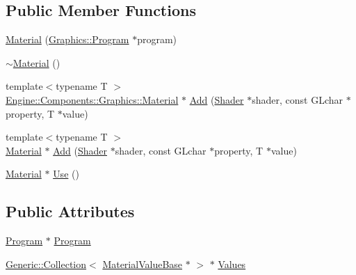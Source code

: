 \subsection*{Public Member Functions}
\begin{DoxyCompactItemize}
\item 
\mbox{\hyperlink{classEngine_1_1Components_1_1Graphics_1_1Material_aefc17351f5af8ca7227e2a8144e141de}{Material}} (\mbox{\hyperlink{classEngine_1_1Components_1_1Graphics_1_1Program}{Graphics\+::\+Program}} $\ast$program)
\item 
\mbox{\hyperlink{classEngine_1_1Components_1_1Graphics_1_1Material_a30532acd75ec38c01db2b5c21776710b}{$\sim$\+Material}} ()
\item 
{\footnotesize template$<$typename T $>$ }\\\mbox{\hyperlink{classEngine_1_1Components_1_1Graphics_1_1Material}{Engine\+::\+Components\+::\+Graphics\+::\+Material}} $\ast$ \mbox{\hyperlink{classEngine_1_1Components_1_1Graphics_1_1Material_aac7709d6bda9b0b16b771fa6530d140e}{Add}} (\mbox{\hyperlink{classEngine_1_1Components_1_1Graphics_1_1Shader}{Shader}} $\ast$shader, const G\+Lchar $\ast$property, T $\ast$value)
\item 
{\footnotesize template$<$typename T $>$ }\\\mbox{\hyperlink{classEngine_1_1Components_1_1Graphics_1_1Material}{Material}} $\ast$ \mbox{\hyperlink{classEngine_1_1Components_1_1Graphics_1_1Material_ace1e6c024847604594bc4f3d99d0be08}{Add}} (\mbox{\hyperlink{classEngine_1_1Components_1_1Graphics_1_1Shader}{Shader}} $\ast$shader, const G\+Lchar $\ast$property, T $\ast$value)
\item 
\mbox{\hyperlink{classEngine_1_1Components_1_1Graphics_1_1Material}{Material}} $\ast$ \mbox{\hyperlink{classEngine_1_1Components_1_1Graphics_1_1Material_aef1dd6fbbf0268d4f3e6c371a2f1aa8d}{Use}} ()
\end{DoxyCompactItemize}
\subsection*{Public Attributes}
\begin{DoxyCompactItemize}
\item 
\mbox{\hyperlink{classEngine_1_1Components_1_1Graphics_1_1Program}{Program}} $\ast$ \mbox{\hyperlink{classEngine_1_1Components_1_1Graphics_1_1Material_a2a4084db93bb70cd65032baf296803d6}{Program}}
\item 
\mbox{\hyperlink{classGeneric_1_1Collection}{Generic\+::\+Collection}}$<$ \mbox{\hyperlink{classEngine_1_1Components_1_1Graphics_1_1MaterialValueBase}{Material\+Value\+Base}} $\ast$ $>$ $\ast$ \mbox{\hyperlink{classEngine_1_1Components_1_1Graphics_1_1Material_a34335608ba1e6eb2c2dba5032107eab0}{Values}}
\end{DoxyCompactItemize}


